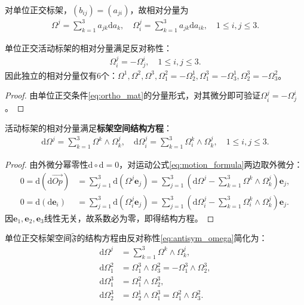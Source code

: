 \documentclass[../../main.tex]{subfiles}%
\begin{document}
\begin{definition}
对单位正交标架，$(b_{ij})=(a_{ji})$，故相对分量为
\begin{align}
\Omega^j=\sum\limits_{k=1}^3a_{jk}\mathrm{d}a_k,\quad \Omega_i^j=\sum\limits_{k=1}^3a_{jk}\mathrm{d}a_{ik},\quad 1\leqslant i,j\leqslant3.
\label{eq:ortho_rel_comp}
\end{align}
\end{definition}

\begin{proposition}
单位正交活动标架的相对分量满足反对称性：
\begin{align}
\Omega_i^j=-\Omega_j^i,\quad 1\leqslant i,j\leqslant3.
\label{eq:antisym_omega}
\end{align}
因此独立的相对分量仅有6个：$\Omega^1,\Omega^2,\Omega^3,\Omega_1^2=-\Omega_2^1,\Omega_1^3=-\Omega_3^1,\Omega_2^3=-\Omega_3^2$。
\end{proposition}
\begin{proof}
由单位正交条件\eqref{eq:ortho_mat}的分量形式，对其微分即可验证$\Omega_i^j=-\Omega_j^i$。
\end{proof}

\begin{theorem}
活动标架的相对分量满足\textbf{标架空间结构方程}：
\begin{align}
\mathrm{d}\Omega^j=\sum\limits_{k=1}^3\Omega^k\wedge\Omega_k^j,\quad \mathrm{d}\Omega_i^j=\sum\limits_{k=1}^3\Omega_i^k\wedge\Omega_k^j,\quad 1\leqslant i,j\leqslant3.
\label{eq:struct_eq_global}
\end{align}
\end{theorem}
\begin{proof}
由外微分幂零性$\mathrm{d}\circ\mathrm{d}=0$，对运动公式\eqref{eq:motion_formula}两边取外微分：
\begin{align*}
0=\mathrm{d}(\mathrm{d}\overrightarrow{Op})&=\sum\limits_{j=1}^3\mathrm{d}(\Omega^j\boldsymbol{e}_j)=\sum\limits_{j=1}^3\left(\mathrm{d}\Omega^j-\sum\limits_{k=1}^3\Omega^k\wedge\Omega_k^j\right)\boldsymbol{e}_j,\\
0=\mathrm{d}(\mathrm{d}\boldsymbol{e}_i)&=\sum\limits_{j=1}^3\mathrm{d}(\Omega_i^j\boldsymbol{e}_j)=\sum\limits_{j=1}^3\left(\mathrm{d}\Omega_i^j-\sum\limits_{k=1}^3\Omega_i^k\wedge\Omega_k^j\right)\boldsymbol{e}_j.
\end{align*}
因$\boldsymbol{e}_1,\boldsymbol{e}_2,\boldsymbol{e}_3$线性无关，故系数必为零，即得结构方程。
\end{proof}

\begin{remark}
单位正交标架空间$\tilde{\mathfrak{F}}$的结构方程由反对称性\eqref{eq:antisym_omega}简化为：
\begin{align*}
\mathrm{d}\Omega^j&=\sum\limits_{k=1}^3\Omega^k\wedge\Omega_k^j,\\
\mathrm{d}\Omega_1^2&=\Omega_1^3\wedge\Omega_3^2=-\Omega_1^3\wedge\Omega_2^3,\\
\mathrm{d}\Omega_1^3&=\Omega_1^2\wedge\Omega_2^3,\\
\mathrm{d}\Omega_2^3&=\Omega_2^1\wedge\Omega_1^3=\Omega_1^2\wedge\Omega_3^2.
\end{align*}
\end{remark}
\end{document}
